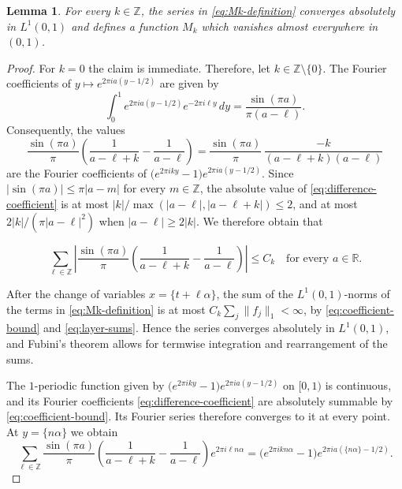 \documentclass[reqno,a4paper,12pt]{amsart}
\numberwithin{equation}{section}
\newtheorem{lemma}[definition]{Lemma}
\def\Z{{\mathbb Z}}
\def\R{{\mathbb R}}
\newcommand\1{\mathds{1}}
\begin{document}
\begin{lemma}\label{lem:M-fourier}
For every $k\in\Z$, the series in \eqref{eq:Mk-definition} converges
absolutely in $L^1(0,1)$ and defines a function $M_k$
which vanishes almost everywhere in $(0,1)$.
\end{lemma}

\begin{proof}
For $k=0$ the claim is immediate. Therefore, let $k\in\Z\setminus\{0\}$.
The Fourier coefficients of $y\mapsto e^{2\pi ia(y-1/2)}$ are given by
\[
 \int_0^1e^{2\pi ia(y-1/2)}e^{-2\pi i\ell y}\,dy
 =\frac{\sin(\pi a)}{\pi(a-\ell)}.
\]
Consequently, the values
\begin{equation}\label{eq:difference-coefficient}
 \frac{\sin(\pi a)}{\pi}
 \left(\frac1{a-\ell+k}-\frac1{a-\ell}\right)
 =\frac{\sin(\pi a)}{\pi}\,
 \frac{-k}{(a-\ell+k)(a-\ell)}
\end{equation}
are the Fourier coefficients of
$\bigl(e^{2\pi iky}-1\bigr)e^{2\pi ia(y-1/2)}$.
Since
$|\sin(\pi a)|\leq\pi|a-m|$ for every $m\in\Z$, the absolute value of
\eqref{eq:difference-coefficient} is at most
$|k|/\max(|a-\ell|,|a-\ell+k|)\leq2$, and at most
$2|k|/(\pi|a-\ell|^2)$ when $|a-\ell|\geq2|k|$. We therefore obtain that

\begin{equation}\label{eq:coefficient-bound}
 \sum_{\ell\in\Z}
 \left|\frac{\sin(\pi a)}{\pi}
 \left(\frac1{a-\ell+k}-\frac1{a-\ell}\right)\right|
 \leq C_k
 \quad\text{for every }a\in\R.
\end{equation}

After the change of variables $x=\{t+\ell\alpha\}$, the sum of the $L^1(0,1)$-norms of the terms in \eqref{eq:Mk-definition} is at most $C_k\sum_j\|f_j\|_1<\infty$, by
\eqref{eq:coefficient-bound} and \eqref{eq:layer-sums}. Hence the series converges absolutely in $L^1(0,1)$, and Fubini's theorem allows for termwise integration and rearrangement of the sums.

The $1$-periodic function given by
$\bigl(e^{2\pi iky}-1\bigr)e^{2\pi ia(y-1/2)}$ on $[0,1)$ is continuous,
and its Fourier coefficients \eqref{eq:difference-coefficient} are
absolutely summable by \eqref{eq:coefficient-bound}. Its Fourier
series therefore converges to it at every point.  At $y=\{n\alpha\}$
we obtain
\[
 \sum_{\ell\in\Z}\frac{\sin(\pi a)}{\pi}
 \left(\frac1{a-\ell+k}-\frac1{a-\ell}\right)e^{2\pi i\ell n\alpha}
 =\bigl(e^{2\pi ikn\alpha}-1\bigr)e^{2\pi ia(\{n\alpha\}-1/2)}.
\]


\end{proof}
\end{document}
